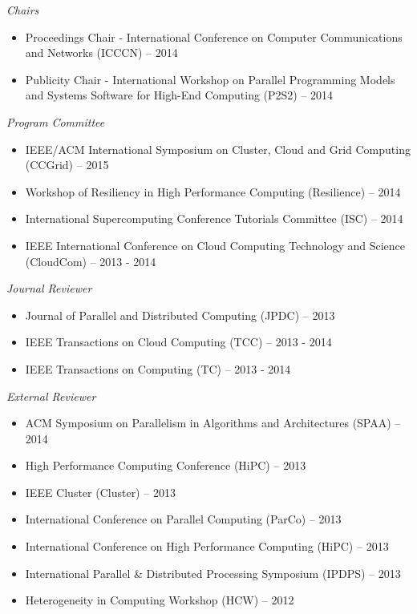 {\sl Chairs}
\begin{itemize}
    \item Proceedings Chair - International Conference on Computer
        Communications and Networks (ICCCN) -- 2014
    \item Publicity Chair - International Workshop on Parallel Programming
        Models and Systems Software for High-End Computing (P2S2) -- 2014
\end{itemize}

{\sl Program Committee}
\begin{itemize}
    \item IEEE/ACM International Symposium on Cluster, Cloud and Grid
        Computing (CCGrid) -- 2015
    \item Workshop of Resiliency in High Performance Computing (Resilience) --
        2014
    \item International Supercomputing Conference Tutorials Committee (ISC) --
        2014
    \item IEEE International Conference on Cloud Computing Technology and
        Science (CloudCom) -- 2013 - 2014
\end{itemize}

{\sl Journal Reviewer}
\begin{itemize}
    \item Journal of Parallel and Distributed Computing (JPDC) -- 2013
    \item IEEE Transactions on Cloud Computing (TCC) -- 2013 - 2014
    \item IEEE Transactions on Computing (TC) -- 2013 - 2014
\end{itemize}

{\sl External Reviewer}
\begin{itemize}
    \item ACM Symposium on Parallelism in Algorithms and Architectures (SPAA) -- 2014
    \item High Performance Computing Conference (HiPC) -- 2013
    \item IEEE Cluster (Cluster) -- 2013
    \item International Conference on Parallel Computing (ParCo) -- 2013
    \item International Conference on High Performance Computing (HiPC) -- 2013
    \item International Parallel \& Distributed Processing Symposium (IPDPS) -- 2013
    \item Heterogeneity in Computing Workshop (HCW) -- 2012
\end{itemize}


